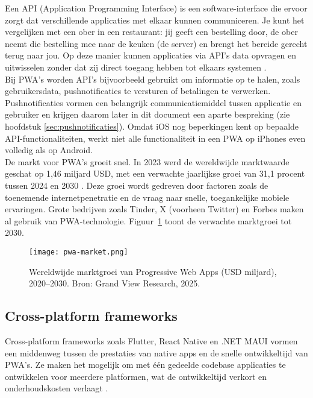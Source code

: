 Een API (Application Programming Interface) is een software-interface die ervoor zorgt dat verschillende applicaties met elkaar kunnen communiceren. Je kunt het vergelijken met een ober in een restaurant: jij geeft een bestelling door, de ober neemt die bestelling mee naar de keuken (de server) en brengt het bereide gerecht terug naar jou. Op deze manier kunnen applicaties via API’s data opvragen en uitwisselen zonder dat zij direct toegang hebben tot elkaars systemen \autocite{Zhong2015}.\\  

Bij PWA’s worden API’s bijvoorbeeld gebruikt om informatie op te halen, zoals gebruikersdata, pushnotificaties te versturen of betalingen te verwerken. Pushnotificaties vormen een belangrijk communicatiemiddel tussen applicatie en gebruiker en krijgen daarom later in dit document een aparte bespreking (zie hoofdstuk \ref{sec:pushnotificaties}). Omdat iOS nog beperkingen kent op bepaalde API-functionaliteiten, werkt niet alle functionaliteit in een PWA op iPhones even volledig als op Android.\\  

De markt voor PWA’s groeit snel. In 2023 werd de wereldwijde marktwaarde geschat op 1,46 miljard USD, met een verwachte jaarlijkse groei van 31,1 procent tussen 2024 en 2030 \autocite{Research2024}. Deze groei wordt gedreven door factoren zoals de toenemende internetpenetratie en de vraag naar snelle, toegankelijke mobiele ervaringen. Grote bedrijven zoals Tinder, X (voorheen Twitter) en Forbes maken al gebruik van PWA-technologie. Figuur~\ref{fig:pwa_market} toont de verwachte marktgroei tot 2030.\\  


\begin{figure}[h]
    \centering
    \texttt{[image: pwa-market.png]}
    \caption{Wereldwijde marktgroei van Progressive Web Apps (USD miljard), 2020–2030. Bron: Grand View Research, 2025. \autocite{Research2024}}
    \label{fig:pwa_market}
\end{figure}

\subsection{Cross-platform frameworks}
Cross-platform frameworks zoals Flutter, React Native en .NET MAUI vormen een middenweg tussen de prestaties van native apps en de snelle ontwikkeltijd van PWA’s. Ze maken het mogelijk om met één gedeelde codebase applicaties te ontwikkelen voor meerdere platformen, wat de ontwikkeltijd verkort en onderhoudskosten verlaagt \autocite{MuhammadKhanLodhi2023}.\\

